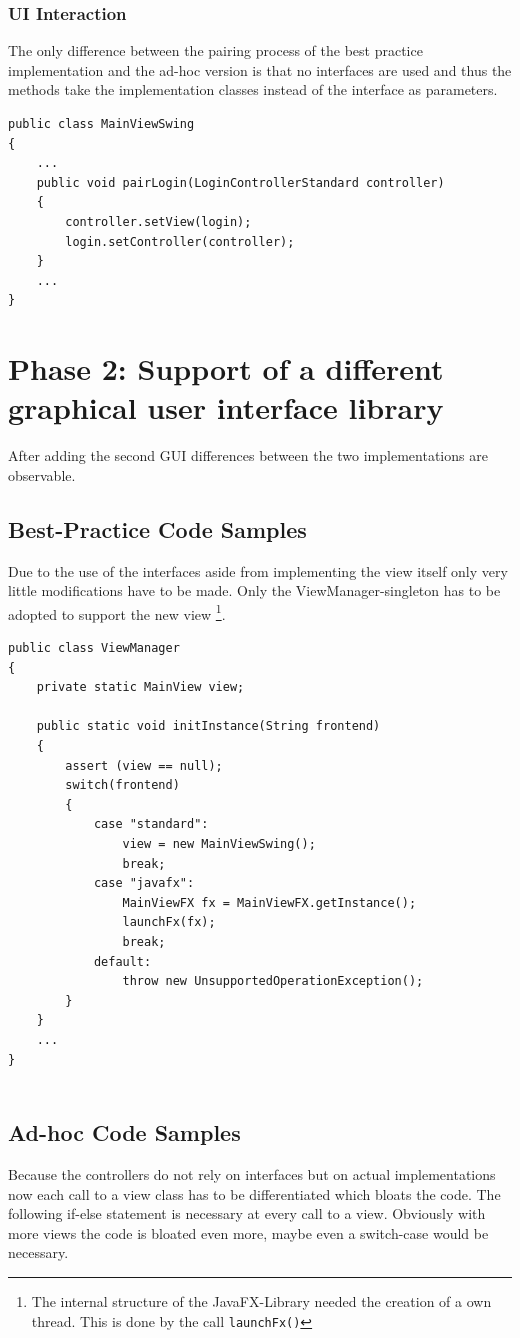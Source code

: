 \subsubsection{UI Interaction}
The only difference between the pairing process of the best practice implementation and the ad-hoc version is that no interfaces are used and thus the methods take the implementation  classes instead of the interface as parameters. 

\begin{lstlisting}
public class MainViewSwing
{
	...
	public void pairLogin(LoginControllerStandard controller)
	{
		controller.setView(login);
		login.setController(controller);
	}
	...
}
\end{lstlisting}


\section{Phase 2: Support of a different graphical user interface library}
After adding the second GUI differences between the two implementations are observable.

\subsection{Best-Practice Code Samples}
Due to the use of the interfaces aside from implementing the view itself only very little modifications have to be made. Only the ViewManager-singleton has to be adopted to support the new view \footnote{The internal structure of the JavaFX-Library needed the creation of a own thread. This is done by the call \texttt{launchFx()}}.

\begin{lstlisting}
public class ViewManager
{
	private static MainView view;
	
	public static void initInstance(String frontend)
	{
		assert (view == null);
		switch(frontend)
		{
			case "standard":
				view = new MainViewSwing();
				break;
			case "javafx":
				MainViewFX fx = MainViewFX.getInstance();
				launchFx(fx);
				break;
			default:
				throw new UnsupportedOperationException();
		}
	}
	...
}
	
\end{lstlisting}

\subsection{Ad-hoc Code Samples}
\label{sec:ad-hoc-javafx}
Because the controllers do not rely on interfaces but on actual implementations now each call to a view class has to be differentiated which bloats the code. The following if-else statement is necessary at every call to a view. Obviously with more views the code is bloated even more, maybe even a switch-case would be necessary.

